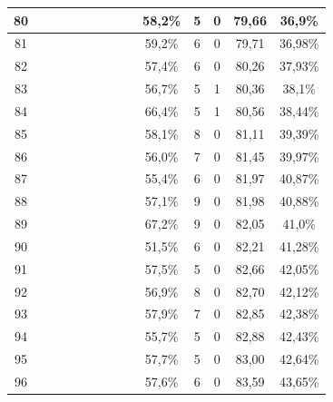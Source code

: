 \begin{longtable}{|c|c|c|c|c|c|c|c|c|c|c|c|c|c|}
80 &  \x    & \x    &       &       & \x    & \x    &       &       & 58,2\% &  5  & 0  & 79,66 & 36,9\% \\ \hline
81 &  \x    & \x    & \x    &       & \x    & \x    & \x\m  &       & 59,2\% &  6  & 0  & 79,71 & 36,98\% \\ \hline
82 &  \x    & \x    & \x    & \x    &       &       & \x    &       & 57,4\% &  6  & 0  & 80,26 & 37,93\% \\ \hline
83 &  \x    & \x    & \x    &       &       &       & \x    &       & 56,7\% &  5  & 1  & 80,36 & 38,1\% \\ \hline
84 &  \x    & \x    & \x    &       & \x\m  &       &       & \x    & 66,4\% &  5  & 1  & 80,56 & 38,44\% \\ \hline
85 &  \x    & \x    & \x    & \x    &       &       &       & \x    & 58,1\% &  8  & 0  & 81,11 & 39,39\% \\ \hline
86 &  \x    & \x    & \x    &       &       & \x    & \x    &       & 56,0\% &  7  & 0  & 81,45 & 39,97\% \\ \hline
87 &  \x    & \x    & \x    &       &       & \x\m  &       & \x\m  & 55,4\% &  6  & 0  & 81,97 & 40,87\% \\ \hline
88 &  \x    & \x    & \x    & \x    &       & \x\m  &       & \x\m  & 57,1\% &  9  & 0  & 81,98 & 40,88\% \\ \hline
89 &  \x    & \x    & \x    &       & \x\m  &       &       &       & 67,2\% &  9  & 0  & 82,05 & 41,0\% \\ \hline
90 &  \x    & \x    &       &       &       &       &       &       & 51,5\% &  6  & 0  & 82,21 & 41,28\% \\ \hline
91 &  \x    & \x    & \x    & \x    &       & \x    &       & \x    & 57,5\% &  5  & 0  & 82,66 & 42,05\% \\ \hline
92 &  \x    & \x    &       & \x    & \x    & \x    &       &       & 56,9\% &  8  & 0  & 82,70 & 42,12\% \\ \hline
93 &  \x    & \x    & \x    & \x    &       & \x\m  & \x\m  &       & 57,9\% &  7  & 0  & 82,85 & 42,38\% \\ \hline
94 &  \x    & \x    &       &       & \x    & \x    &       & \x    & 55,7\% &  5  & 0  & 82,88 & 42,43\% \\ \hline
95 &  \x    & \x    &       &       & \x    &       &       & \x    & 57,7\% &  5  & 0  & 83,00 & 42,64\% \\ \hline
96 &  \x    & \x    & \x    &       &       & \x    & \x\m  &       & 57,6\% &  6  & 0  & 83,59 & 43,65\% \\ \hline

\end{longtable}
